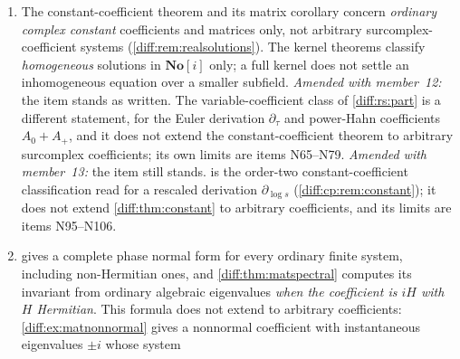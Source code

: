 \documentclass[11pt,letterpaper]{article}
\numberwithin{equation}{section}
\theoremstyle{definition}
\theoremstyle{remark}
\newcommand{\SC}{\mathbf{No}[i]}
\newcommand{\R}{\mathbb R}
\newcommand{\C}{\mathbb C}
\newcommand{\der}{\partial}
\newcommand{\derT}{\der_{\tau}}
\newcommand{\KR}{K_{\R}}
\begin{document}
\begin{enumerate}[label=\textup{N\arabic*.},leftmargin=3.0em,itemsep=0.35em,start=21]
$\der-i$ on $\C((t))$ is the witness (\cref{diff:rem:parentselection}).
 does prove first-order inhomogeneous existence
(\cref{diff:eq:matfirstorder}) and, from it, existence for every forcing of
every finite system (\cref{diff:cor:matinhom}); that conclusion rests
\emph{entirely} on the separately imported
\cref{diff:thm:matsurjectivity} and not on the rank-one criterion, as
\cref{diff:warn:matinhom} states. It leaves the present item standing for the
scalar theory as such, it does not make any homogeneous equation solvable, and
it changes none of the witnesses of \cref{diff:warn:atmostone}: what it adds is
that their uniqueness is now known to be accompanied by existence. No
effectivity follows (item~N57). \emph{Amended with member~12:} for power-Hahn
regular-singular systems and forcing in $\KR^{n}$, inhomogeneous existence holds
\emph{without} that import, with a solution in $\KR[\log t]^{n}$
(\cref{diff:rs:thm:forced,diff:rs:rem:fredholm}); for arbitrary surcomplex
forcing nothing is inferred there (item~N68).
\item The constant-coefficient theorem and its matrix corollary concern
\emph{ordinary complex constant} coefficients and matrices only, not arbitrary
surcomplex-coefficient systems (\cref{diff:rem:realsolutions}). The kernel
theorems classify \emph{homogeneous} solutions in $\SC$ only; a full kernel
does not settle an inhomogeneous equation over a smaller subfield.
\emph{Amended with member~12:} the item stands as written. The variable-coefficient
class of \cref{diff:rs:part} is a different statement, for the Euler derivation
$\derT$ and power-Hahn coefficients $A_{0}+A_{+}$, and it does not extend the
constant-coefficient theorem to arbitrary surcomplex coefficients; its own
limits are items N65--N79. \emph{Amended with member~13:} the item still
stands.  is the order-two constant-coefficient
classification read for a rescaled derivation $\der_{\log s}$
(\cref{diff:cp:rem:constant}); it does not extend \cref{diff:thm:constant} to
arbitrary coefficients, and its limits are items N95--N106.
\item {} gives a complete phase normal form for every
ordinary finite system, including non-Hermitian ones, and \cref{diff:thm:matspectral} computes
its invariant from ordinary algebraic eigenvalues \emph{when the coefficient is
$iH$ with $H$ Hermitian}. This formula does not extend to arbitrary
coefficients: \cref{diff:ex:matnonnormal} gives a
nonnormal coefficient with instantaneous eigenvalues $\pm i$ whose system

\end{enumerate}
\end{document}
